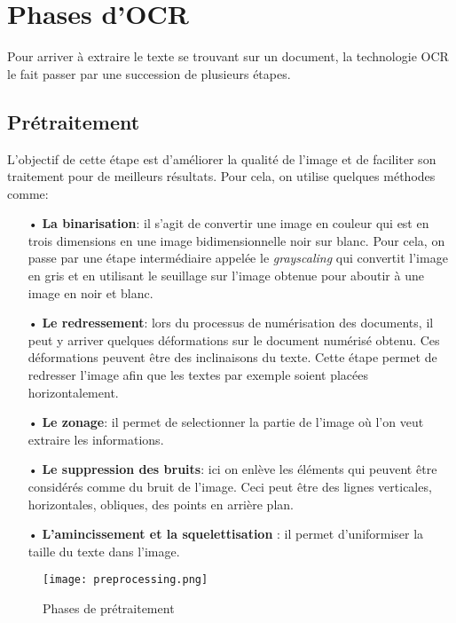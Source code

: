 \section{Phases d'OCR}
Pour arriver à extraire le texte se trouvant sur un document, la technologie OCR le fait passer par une succession de plusieurs étapes.
    \subsection{Prétraitement}
    L’objectif de cette étape est d’améliorer la qualité de l’image et de faciliter son traitement pour de meilleurs résultats. Pour cela, on utilise quelques méthodes comme:
    \begin{itemize}
        \item[•]\textbf{La binarisation}: il s'agit de convertir une image en couleur qui est en trois dimensions en une image bidimensionnelle noir sur blanc. Pour cela, on passe par une étape intermédiaire
        appelée le \textit{grayscaling} qui convertit l'image en gris et en utilisant le seuillage sur l'image obtenue pour aboutir à une image en noir et blanc.
        \item[•]\textbf{Le redressement}: lors du processus de numérisation des documents, il peut y arriver
        quelques déformations sur le document numérisé obtenu. Ces déformations peuvent être des
        inclinaisons du texte. Cette étape permet de redresser l'image afin que les textes par exemple
        soient placées horizontalement.
        \item[•]\textbf{Le zonage}: il permet de selectionner la partie de l'image où l'on veut extraire les informations.
        \item[•]\textbf{Le suppression des bruits}: ici on enlève les éléments qui peuvent être considérés comme du bruit de l'image. Ceci peut être des lignes verticales, horizontales, obliques, des points en arrière plan.
        \item[•]\textbf{L'amincissement et la squelettisation }: il permet d'uniformiser la taille du texte dans l'image.   
    \end{itemize}
    \begin{figure}[H]
        \centering
        \texttt{[image: preprocessing.png]}
        \caption{Phases de prétraitement}
    \end{figure}
